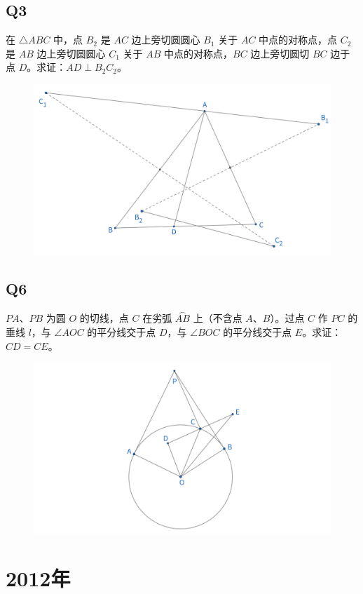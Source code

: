 \documentclass{article}
\begin{document}
\subsection{Q3}
在 $\triangle ABC$ 中，点 $B_2$ 是 $AC$ 边上旁切圆圆心 $B_1$ 关于 $AC$ 中点的对称点，点 $C_2$ 是 $AB$ 边上旁切圆圆心 $C_1$ 关于 $AB$ 中点的对称点，$BC$ 边上旁切圆切 $BC$ 边于点 $D$。求证：$AD \perp B_2C_2$。
\begin{figure}[htbp]
    \centering
    \includegraphics[width=0.7\linewidth]{figures/西部赛13年Q3.png}
\end{figure}


\subsection{Q6}
$PA$、$PB$ 为圆 $O$ 的切线，点 $C$ 在劣弧 $\overset{\frown}{AB}$ 上（不含点 $A$、$B$）。过点 $C$ 作 $PC$ 的垂线 $l$，与 $\angle AOC$ 的平分线交于点 $D$，与 $\angle BOC$ 的平分线交于点 $E$。求证：$CD = CE$。
\begin{figure}[htbp]
    \centering
    \includegraphics[width=1\linewidth]{figures/西部赛13年Q6.png}
\end{figure}


\newpage 
\section{2012年}
\end{document}
